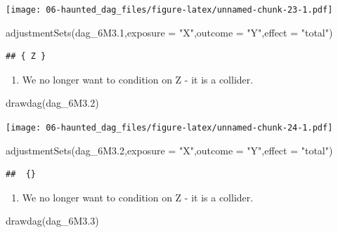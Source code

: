 \documentclass[
]{book}
\newenvironment{Shaded}{\begin{snugshade}}{\end{snugshade}}
\newcommand{\AttributeTok}[1]{\textcolor[rgb]{0.77,0.63,0.00}{#1}}
\newcommand{\FloatTok}[1]{\textcolor[rgb]{0.00,0.00,0.81}{#1}}
\newcommand{\FunctionTok}[1]{\textcolor[rgb]{0.00,0.00,0.00}{#1}}
\newcommand{\NormalTok}[1]{#1}
\newcommand{\StringTok}[1]{\textcolor[rgb]{0.31,0.60,0.02}{#1}}
\providecommand{\tightlist}{%
  \setlength{\itemsep}{0pt}\setlength{\parskip}{0pt}}
\begin{document}
\texttt{[image: 06-haunted\_dag\_files/figure-latex/unnamed-chunk-23-1.pdf]}

\begin{Shaded}
\begin{Highlighting}[]
\FunctionTok{adjustmentSets}\NormalTok{(dag\_6M3}\FloatTok{.1}\NormalTok{,}\AttributeTok{exposure =} \StringTok{"X"}\NormalTok{,}\AttributeTok{outcome =} \StringTok{"Y"}\NormalTok{,}\AttributeTok{effect =} \StringTok{"total"}\NormalTok{)}
\end{Highlighting}
\end{Shaded}

\begin{verbatim}
## { Z }
\end{verbatim}

\begin{enumerate}
\def\labelenumi{\arabic{enumi}.}
\setcounter{enumi}{1}
\tightlist
\item
  We no longer want to condition on Z - it is a collider.
\end{enumerate}

\begin{Shaded}
\begin{Highlighting}[]
\FunctionTok{drawdag}\NormalTok{(dag\_6M3}\FloatTok{.2}\NormalTok{)}
\end{Highlighting}
\end{Shaded}

\texttt{[image: 06-haunted\_dag\_files/figure-latex/unnamed-chunk-24-1.pdf]}

\begin{Shaded}
\begin{Highlighting}[]
\FunctionTok{adjustmentSets}\NormalTok{(dag\_6M3}\FloatTok{.2}\NormalTok{,}\AttributeTok{exposure =} \StringTok{"X"}\NormalTok{,}\AttributeTok{outcome =} \StringTok{"Y"}\NormalTok{,}\AttributeTok{effect =} \StringTok{"total"}\NormalTok{)}
\end{Highlighting}
\end{Shaded}

\begin{verbatim}
##  {}
\end{verbatim}

\begin{enumerate}
\def\labelenumi{\arabic{enumi}.}
\setcounter{enumi}{2}
\tightlist
\item
  We no longer want to condition on Z - it is a collider.
\end{enumerate}

\begin{Shaded}
\begin{Highlighting}[]
\FunctionTok{drawdag}\NormalTok{(dag\_6M3}\FloatTok{.3}\NormalTok{)}
\end{Highlighting}
\end{Shaded}
\end{document}
